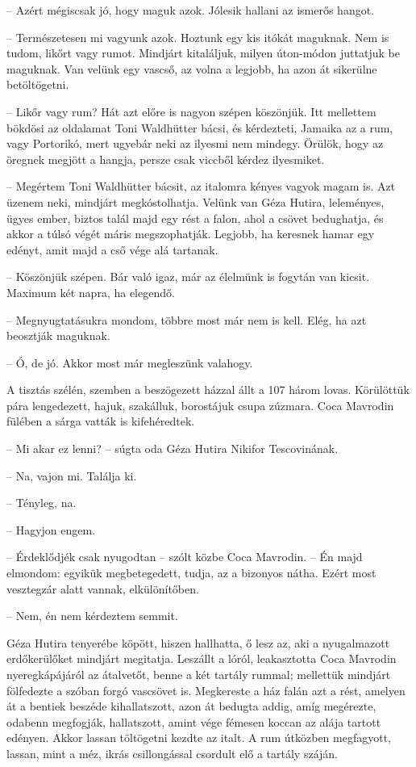 \documentclass{IEEEtran}
\begin{document}
– Azért mégiscsak jó, hogy maguk azok. Jólesik hallani az ismerős hangot.

– Természetesen mi vagyunk azok. Hoztunk egy kis itókát maguknak. Nem is
tudom, likőrt vagy rumot. Mindjárt kitaláljuk, milyen úton-módon juttatjuk be
maguknak. Van velünk egy vascső, az volna a legjobb, ha azon át sikerülne
betöltögetni.

– Likőr vagy rum? Hát azt előre is nagyon szépen köszönjük. Itt mellettem
bökdösi az oldalamat Toni Waldhütter bácsi, és kérdezteti, Jamaika az a rum,
vagy Portorikó, mert ugyebár neki az ilyesmi nem mindegy. Örülök, hogy az
öregnek megjött a hangja, persze csak viccből kérdez ilyesmiket.

– Megértem Toni Waldhütter bácsit, az italomra kényes vagyok magam is. Azt
üzenem neki, mindjárt megkóstolhatja. Velünk van Géza Hutira, leleményes,
ügyes ember, biztos talál majd egy rést a falon, ahol a csövet bedughatja, és
akkor a túlsó végét máris megszophatják. Legjobb, ha keresnek hamar egy
edényt, amit majd a cső vége alá tartanak.

– Köszönjük szépen. Bár való igaz, már az élelmünk is fogytán van kicsit.
Maximum két napra, ha elegendő.

– Megnyugtatásukra mondom, többre most már nem is kell. Elég, ha azt beosztják
maguknak.

– Ó, de jó. Akkor most már megleszünk valahogy.

A tisztás szélén, szemben a beszögezett házzal állt a 107 három lovas.
Körülöttük pára lengedezett, hajuk, szakálluk, borostájuk csupa zúzmara. Coca
Mavrodin fülében a sárga vatták is kifehéredtek.

– Mi akar ez lenni? – súgta oda Géza Hutira Nikifor Tescovinának.

– Na, vajon mi. Találja ki.

– Tényleg, na.

– Hagyjon engem.

– Érdeklődjék csak nyugodtan – szólt közbe Coca Mavrodin. – Én majd elmondom:
egyikük megbetegedett, tudja, az a bizonyos nátha. Ezért most vesztegzár alatt
vannak, elkülönítőben.

– Nem, én nem kérdeztem semmit.

Géza Hutira tenyerébe köpött, hiszen hallhatta, ő lesz az, aki a nyugalmazott
erdőkerülőket mindjárt megitatja. Leszállt a lóról, leakasztotta Coca Mavrodin
nyeregkápájáról az átalvetőt, benne a két tartály rummal; mellettük mindjárt
fölfedezte a szóban forgó vascsövet is. Megkereste a ház falán azt a rést,
amelyen át a bentiek beszéde kihallatszott, azon át bedugta addig, amíg
megérezte, odabenn megfogják, hallatszott, amint vége fémesen koccan az alája
tartott edényen. Akkor lassan töltögetni kezdte az italt. A rum útközben
megfagyott, lassan, mint a méz, ikrás csillongással csordult elő a tartály
száján.
\end{document}
